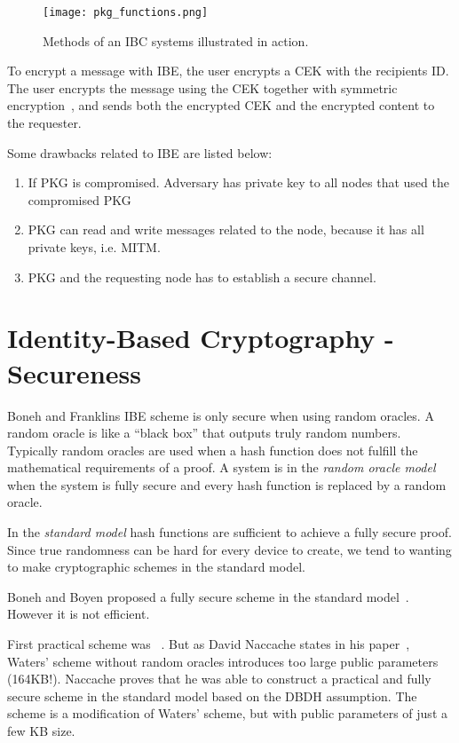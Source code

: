 \begin{figure}[ht]
  \centering
  \texttt{[image: pkg\_functions.png]}
  \caption{Methods of an IBC systems illustrated in action.}
  \label{fig:pkg_functions}
\end{figure}

To encrypt a message with \gls{IBE}, the user encrypts a \gls{CEK} with the recipients \gls{ID}.
The user encrypts the message using the \gls{CEK} together with symmetric encryption~\cite[section 2.2.2]{rfc5408}, and sends both the encrypted \gls{CEK} and the encrypted content to the requester. 

Some drawbacks related to \gls{IBE} are listed below:
\begin{enumerate}
	\item If \gls{PKG} is compromised. Adversary has private key to all nodes that used the compromised \gls{PKG}
	\item \gls{PKG} can read and write messages related to the node, because it has all private keys, i.e. \gls{MITM}.
	\item \gls{PKG} and the requesting node has to establish a secure channel. 
\end{enumerate}

\section{Identity-Based Cryptography - Secureness}

Boneh and Franklins \gls{IBE} scheme is only secure when using random oracles.
A random oracle is like a ``black box'' that outputs truly random numbers.
Typically random oracles are used when a hash function does not fulfill the mathematical requirements of a proof. 
A system is in the \textit{random oracle model} when the system is fully secure and every hash function is replaced by a random oracle.


In the \textit{standard model} hash functions are sufficient to achieve a fully secure proof.
Since true randomness can be hard for every device to create, we tend to wanting to make cryptographic schemes in the standard model.

Boneh and Boyen proposed a fully secure scheme in the standard model~\cite{DBLP:conf/crypto/BonehB04}.
However it is not efficient. 

First practical scheme was ~\cite{DBLP:journals/iacr/Waters04}.
But as David Naccache states in his paper~\cite{DBLP:journals/iacr/Naccache05}, Waters' scheme without random oracles introduces too large public parameters (164\gls{KB}!).
Naccache proves that he was able to construct a practical and fully secure scheme in the standard model based on the \gls{DBDH} assumption.
The scheme is a modification of Waters' scheme, but with public parameters of just a few \gls{KB} size.

